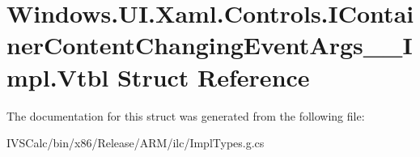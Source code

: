 \hypertarget{struct_windows_1_1_u_i_1_1_xaml_1_1_controls_1_1_i_container_content_changing_event_args_____impl_1_1_vtbl}{}\section{Windows.\+U\+I.\+Xaml.\+Controls.\+I\+Container\+Content\+Changing\+Event\+Args\+\_\+\+\_\+\+Impl.\+Vtbl Struct Reference}
\label{struct_windows_1_1_u_i_1_1_xaml_1_1_controls_1_1_i_container_content_changing_event_args_____impl_1_1_vtbl}


The documentation for this struct was generated from the following file\+:\begin{DoxyCompactItemize}
\item 
I\+V\+S\+Calc/bin/x86/\+Release/\+A\+R\+M/ilc/Impl\+Types.\+g.\+cs\end{DoxyCompactItemize}
